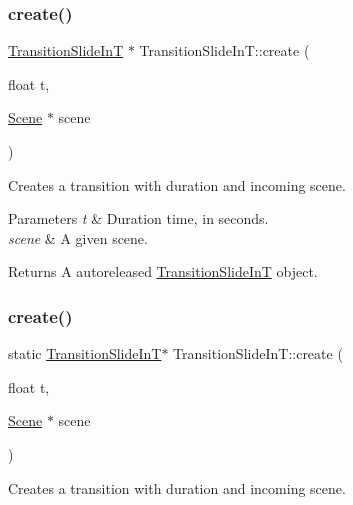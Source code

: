 \subsubsection{\texorpdfstring{create()}{create()}\hspace{0.1cm}{\footnotesize\ttfamily [1/2]}}
{\footnotesize\ttfamily \hyperlink{classTransitionSlideInT}{Transition\+Slide\+InT} $\ast$ Transition\+Slide\+In\+T\+::create (\begin{DoxyParamCaption}\item[{float}]{t,  }\item[{\hyperlink{classScene}{Scene} $\ast$}]{scene }\end{DoxyParamCaption})\hspace{0.3cm}{\ttfamily [static]}}

Creates a transition with duration and incoming scene.


\begin{DoxyParams}{Parameters}
{\em t} & Duration time, in seconds. \\
\hline
{\em scene} & A given scene. \\
\hline
\end{DoxyParams}
\begin{DoxyReturn}{Returns}
A autoreleased \hyperlink{classTransitionSlideInT}{Transition\+Slide\+InT} object. 
\end{DoxyReturn}
\mbox{\label{classTransitionSlideInT_a125bf4799c4b4c8cb5fb4c4da9b56461}} 
\subsubsection{\texorpdfstring{create()}{create()}\hspace{0.1cm}{\footnotesize\ttfamily [2/2]}}
{\footnotesize\ttfamily static \hyperlink{classTransitionSlideInT}{Transition\+Slide\+InT}$\ast$ Transition\+Slide\+In\+T\+::create (\begin{DoxyParamCaption}\item[{float}]{t,  }\item[{\hyperlink{classScene}{Scene} $\ast$}]{scene }\end{DoxyParamCaption})\hspace{0.3cm}{\ttfamily [static]}}

Creates a transition with duration and incoming scene.


